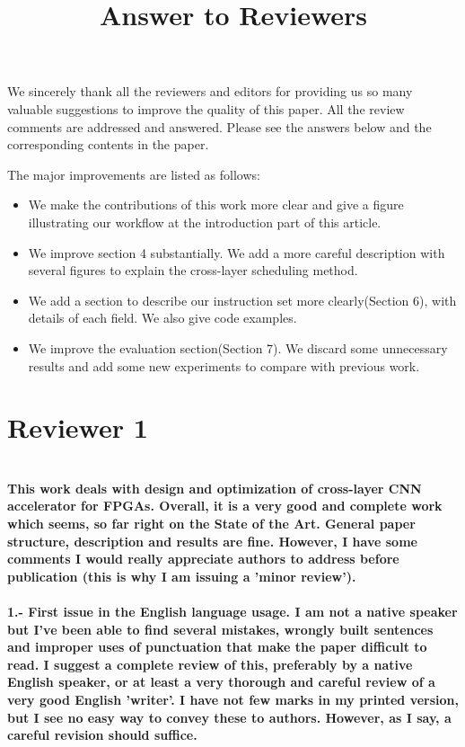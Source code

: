 \documentclass[12pt]{paper}
\title{Answer to Reviewers}
\newcommand{\rev}[1]{{{\color[rgb]{0,0,1}{#1}}}}
\newcommand{\reviewer}[1]{\section*{Reviewer #1}}
\newcommand{\comment}[1]{\noindent\textbf{\\ #1}\\}
\begin{document}
\maketitle

We sincerely thank all the reviewers and editors for providing us so many valuable suggestions to improve the quality of this paper. All the review comments are addressed and answered. Please see the answers below and the corresponding contents in the paper.

\rev{The newly added contents and the major revised contents are marked in blue in the paper and in this letter.}

The major improvements are listed as follows:



\begin{itemize}
    \item We make the contributions of this work more clear and give a figure illustrating our workflow at the introduction part of this article. 

    \item We improve section 4 substantially. We add a more careful description with several figures to explain the cross-layer scheduling method.

    \item We add a section to describe our instruction set more clearly(Section 6), with details of each field. We also give code examples.
    
    \item We improve the evaluation section(Section 7). We discard some unnecessary results and add some new experiments to compare with previous work.

\end{itemize}

\reviewer{1}

\comment{This work deals with design and optimization of cross-layer CNN accelerator for FPGAs. Overall, it is a very good and complete work which seems, so far right on the State of the Art. General paper structure, description and results are fine. However, I have some comments I would really appreciate authors to address before publication (this is why I am issuing a 'minor review'). 
}

\comment{1.- First issue in the English language usage. I am not a native speaker but I've been able to find several mistakes, wrongly built sentences and improper uses of punctuation that make the paper difficult to read. I suggest a complete review of this, preferably by a native English speaker, or at least a very thorough and careful review of a very good English 'writer'. I have not few marks in my printed version, but I see no easy way to convey these to authors. However, as I say, a careful revision should suffice.}
\end{document}
